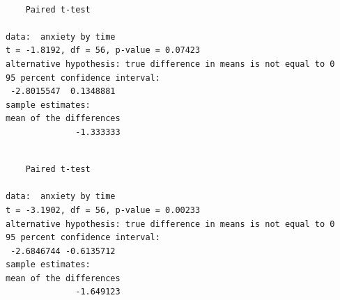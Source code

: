\documentclass[]{article}
\newenvironment{Shaded}{\begin{snugshade}}{\end{snugshade}}
\newcommand{\KeywordTok}[1]{\textcolor[rgb]{0.13,0.29,0.53}{\textbf{#1}}}
\newcommand{\DataTypeTok}[1]{\textcolor[rgb]{0.13,0.29,0.53}{#1}}
\newcommand{\StringTok}[1]{\textcolor[rgb]{0.31,0.60,0.02}{#1}}
\newcommand{\CommentTok}[1]{\textcolor[rgb]{0.56,0.35,0.01}{\textit{#1}}}
\newcommand{\OtherTok}[1]{\textcolor[rgb]{0.56,0.35,0.01}{#1}}
\newcommand{\OperatorTok}[1]{\textcolor[rgb]{0.81,0.36,0.00}{\textbf{#1}}}
\newcommand{\NormalTok}[1]{#1}
\begin{document}
\begin{verbatim}

    Paired t-test

data:  anxiety by time
t = -1.8192, df = 56, p-value = 0.07423
alternative hypothesis: true difference in means is not equal to 0
95 percent confidence interval:
 -2.8015547  0.1348881
sample estimates:
mean of the differences 
              -1.333333 
\end{verbatim}

\begin{Shaded}
\end{Shaded}

\begin{verbatim}

    Paired t-test

data:  anxiety by time
t = -3.1902, df = 56, p-value = 0.00233
alternative hypothesis: true difference in means is not equal to 0
95 percent confidence interval:
 -2.6846744 -0.6135712
sample estimates:
mean of the differences 
              -1.649123 
\end{verbatim}

\begin{Shaded}
\end{Shaded}
\end{document}

